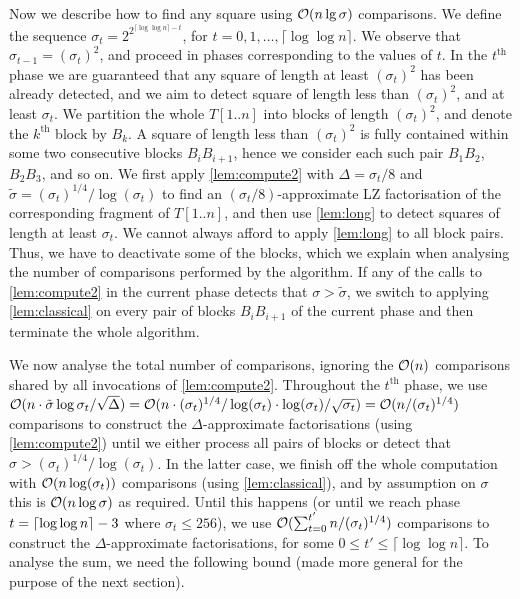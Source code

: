 Now we describe how to find any square using $\mathcal{O}(n \lg \sigma)$ comparisons.
We define the sequence $\sigma_t=2^{2^{\lceil\log\log n\rceil-t}}$, for $t=0,1,\ldots,\lceil\log\log n\rceil$.
We observe that $\sigma_{t-1}=(\sigma_{t})^{2}$, and proceed in phases corresponding to the values of $t$.
In the $t^{\text{th}}$ phase we are guaranteed that any square of length at least $(\sigma_{t})^{2}$ has been
already detected, and we aim to detect square of length less than $(\sigma_{t})^{2}$, and at least $\sigma_t$. We partition
the whole $T[1..n]$ into blocks of length $(\sigma_{t})^{2}$, and denote the $k^{\text{th}}$ block by $B_{k}$.
A square of length less than $(\sigma_{t})^{2}$ is fully contained within some two consecutive blocks $B_{i}B_{i+1}$,
hence we consider each such pair $B_{1}B_{2}$, $B_{2}B_{3}$, and so on.
We first apply \cref{lem:compute2} with $\Delta=\sigma_{t}/8$ and $\tilde{\sigma}=(\sigma_{t})^{1/4}/\log(\sigma_{t})$ to find
an $(\sigma_{t}/8)$-approximate LZ factorisation of the corresponding fragment of $T[1..n]$, and then
use \cref{lem:long} to detect squares of length at least $\sigma_t$.
We cannot always afford to apply \cref{lem:long} to all block pairs. Thus, we have to deactivate some of the blocks, which we explain when analysing the number of comparisons performed by the algorithm.
If any of the calls to \cref{lem:compute2} in the current phase detects that $\sigma>\tilde{\sigma}$, we switch to
applying \cref{lem:classical} on every pair of blocks $B_{i}B_{i+1}$ of the current phase and then terminate the whole algorithm.

We now analyse the total number of comparisons, ignoring the $\mathcal{O}(n)$ comparisons shared by all invocations of
\cref{lem:compute2}.
Throughout the $t^{\text{th}}$ phase, we use $\mathcal{O}(n \cdot \tilde{\sigma} \log \sigma_t / \sqrt{\Delta}) = \mathcal{O}(n\cdot (\sigma_{t})^{1/4}/\log(\sigma_{t})\cdot \log(\sigma_{t})/\sqrt{\sigma_{t}})=\mathcal{O}(n/(\sigma_{t})^{1/4})$ comparisons
to construct the $\Delta$-approximate factorisations (using \cref{lem:compute2})
until we either process all pairs of blocks or detect that $\sigma>(\sigma_{t})^{1/4}/\log(\sigma_{t})$. 
In the latter case, we finish off the whole computation with $\mathcal{O}(n\log(\sigma_{t}))$ comparisons (using \cref{lem:classical}), and by assumption on
$\sigma$ this is $\mathcal{O}(n\log \sigma)$ as required.
Until this happens (or until we reach phase $t=\left\lceil\log \log n\right\rceil-3$ where $\sigma_t \leq 256$), we use $\mathcal{O}(\sum_{t=0}^{t'} n/(\sigma_{t})^{1/4})$ comparisons
to construct the $\Delta$-approximate factorisations,
for some $0\leq t'\leq \lceil\log\log n\rceil$.
To analyse the sum, we need the following bound (made more general for the purpose of the next section).

